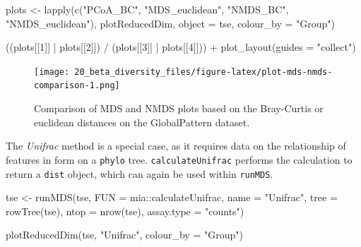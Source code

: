 \documentclass[
]{book}
\newenvironment{Shaded}{\begin{snugshade}}{\end{snugshade}}
\newcommand{\AttributeTok}[1]{\textcolor[rgb]{0.77,0.63,0.00}{#1}}
\newcommand{\DecValTok}[1]{\textcolor[rgb]{0.00,0.00,0.81}{#1}}
\newcommand{\FunctionTok}[1]{\textcolor[rgb]{0.00,0.00,0.00}{#1}}
\newcommand{\NormalTok}[1]{#1}
\newcommand{\OtherTok}[1]{\textcolor[rgb]{0.56,0.35,0.01}{#1}}
\newcommand{\SpecialCharTok}[1]{\textcolor[rgb]{0.00,0.00,0.00}{#1}}
\newcommand{\StringTok}[1]{\textcolor[rgb]{0.31,0.60,0.02}{#1}}
\begin{document}
\begin{Shaded}
\begin{Highlighting}[]
\NormalTok{plots }\OtherTok{\textless{}{-}} \FunctionTok{lapply}\NormalTok{(}\FunctionTok{c}\NormalTok{(}\StringTok{"PCoA\_BC"}\NormalTok{, }\StringTok{"MDS\_euclidean"}\NormalTok{, }\StringTok{"NMDS\_BC"}\NormalTok{, }\StringTok{"NMDS\_euclidean"}\NormalTok{),}
\NormalTok{                plotReducedDim,}
                \AttributeTok{object =}\NormalTok{ tse,}
                \AttributeTok{colour\_by =} \StringTok{"Group"}\NormalTok{)}

\NormalTok{((plots[[}\DecValTok{1}\NormalTok{]] }\SpecialCharTok{|}\NormalTok{ plots[[}\DecValTok{2}\NormalTok{]]) }\SpecialCharTok{/}\NormalTok{ (plots[[}\DecValTok{3}\NormalTok{]] }\SpecialCharTok{|}\NormalTok{ plots[[}\DecValTok{4}\NormalTok{]])) }\SpecialCharTok{+}
  \FunctionTok{plot\_layout}\NormalTok{(}\AttributeTok{guides =} \StringTok{"collect"}\NormalTok{)}
\end{Highlighting}
\end{Shaded}

\begin{figure}
\centering
\texttt{[image: 20\_beta\_diversity\_files/figure-latex/plot-mds-nmds-comparison-1.png]}
\caption{\label{fig:plot-mds-nmds-comparison}Comparison of MDS and NMDS plots based on the Bray-Curtis or euclidean distances on the GlobalPattern dataset.}
\end{figure}

The \emph{Unifrac} method is a special case, as it requires data on the
relationship of features in form on a \texttt{phylo} tree. \texttt{calculateUnifrac}
performs the calculation to return a \texttt{dist} object, which can again be
used within \texttt{runMDS}.

\begin{Shaded}
\begin{Highlighting}[]
\NormalTok{tse }\OtherTok{\textless{}{-}} \FunctionTok{runMDS}\NormalTok{(tse,}
              \AttributeTok{FUN =}\NormalTok{ mia}\SpecialCharTok{::}\NormalTok{calculateUnifrac,}
              \AttributeTok{name =} \StringTok{"Unifrac"}\NormalTok{,}
              \AttributeTok{tree =} \FunctionTok{rowTree}\NormalTok{(tse),}
              \AttributeTok{ntop =} \FunctionTok{nrow}\NormalTok{(tse),}
              \AttributeTok{assay.type =} \StringTok{"counts"}\NormalTok{)}
\end{Highlighting}
\end{Shaded}

\begin{Shaded}
\begin{Highlighting}[]
\FunctionTok{plotReducedDim}\NormalTok{(tse, }\StringTok{"Unifrac"}\NormalTok{,}
               \AttributeTok{colour\_by =} \StringTok{"Group"}\NormalTok{)}
\end{Highlighting}
\end{Shaded}
\end{document}
